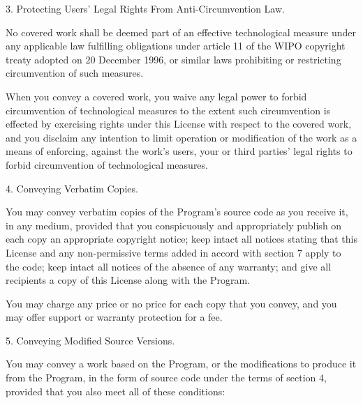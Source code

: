 \documentclass[letterpaper,12pt]{article}
\begin{document}
{3. Protecting Users' Legal Rights From Anti-Circumvention Law.

No covered work shall be deemed part of an effective technological measure under any applicable law fulfilling obligations under article 11 of the WIPO copyright treaty adopted on 20 December 1996, or similar laws prohibiting or restricting circumvention of such measures.

When you convey a covered work, you waive any legal power to forbid circumvention of technological measures to the extent such circumvention is effected by exercising rights under this License with respect to the covered work, and you disclaim any intention to limit operation or modification of the work as a means of enforcing, against the work's users, your or third parties' legal rights to forbid circumvention of technological measures.

4. Conveying Verbatim Copies.

You may convey verbatim copies of the Program's source code as you receive it, in any medium, provided that you conspicuously and appropriately publish on each copy an appropriate copyright notice; keep intact all notices stating that this License and any non-permissive terms added in accord with section 7 apply to the code; keep intact all notices of the absence of any warranty; and give all recipients a copy of this License along with the Program.

You may charge any price or no price for each copy that you convey, and you may offer support or warranty protection for a fee.

5. Conveying Modified Source Versions.

You may convey a work based on the Program, or the modifications to produce it from the Program, in the form of source code under the terms of section 4, provided that you also meet all of these conditions:

}
\end{document}
